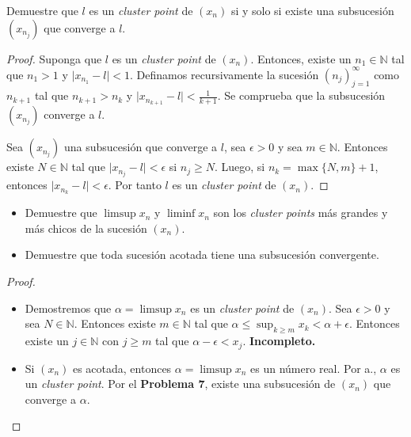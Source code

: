 \documentclass[12pt]{article}
\newcommand{\N}{\mathbb{N}}
\newenvironment{problem}[2][Problema]{\begin{trivlist}
\item[\hskip \labelsep {\bfseries #1}\hskip \labelsep {\bfseries #2.}]}{\end{trivlist}}
\begin{document}
\begin{problem}{7} Demuestre que $l$ es un \textit{cluster point} de $(x_n)$ si y solo si existe una subsucesión $(x_{n_j})$ que converge a $l$.
\end{problem}
\begin{proof}
Suponga que $l$ es un \textit{cluster point} de $(x_n)$. Entonces, existe un $n_1 \in \N$ tal que $n_1 > 1$ y $\lvert x_{n_1}  - l \lvert < 1.$ Definamos recursivamente la sucesión $(n_j)_{j=1}^\infty$ como $n_{k+1}$ tal que $n_{k+1} > n_k$ y $\lvert x_{n_{k+1}}  - l \lvert < \frac{1}{k+1}$. Se comprueba que la subsucesión $(x_{n_j})$ converge a $l$.


Sea $(x_{n_j})$ una subsucesión que converge a $l$, sea $\epsilon > 0$ y sea $m \in \N$. Entonces existe $N \in \N$ tal que $\lvert x_{n_j} - l \lvert < \epsilon$ si $n_j \geq N$. Luego, si $n_k = \max\{N, m\} + 1$, entonces $\lvert x_{n_k} - l \lvert < \epsilon$. Por tanto $l$ es un \textit{cluster point} de $(x_n)$.
\end{proof}


\begin{problem}{8}
\text{ }
\begin{itemize}
    \item[a.] Demuestre que $\limsup{x_n}$ y $\liminf{x_n}$ son los \textit{cluster points} más grandes y más chicos de la sucesión $(x_n).$
    \item[b.] Demuestre que toda sucesión acotada tiene una subsucesión convergente.
\end{itemize}

\end{problem}
\begin{proof}
\text{ }
\begin{itemize}
    \item[a.] Demostremos que $\alpha = \limsup{x_n}$ es un \textit{cluster point} de $(x_n)$. Sea $\epsilon > 0$ y sea $N \in \N$. Entonces existe $m \in \N$ tal que $ \alpha \leq \sup_{k \geq m} x_k < \alpha + \epsilon$. Entonces existe un $j \in \N$ con $j \geq m$ tal que $\alpha - \epsilon < x_j$. \textbf{Incompleto.}
    
    \item[b.] Si $(x_n)$ es acotada, entonces $\alpha = \limsup{x_n}$ es un número real. Por a., $\alpha$ es un \textit{cluster point}. Por el \textbf{Problema 7}, existe una subsucesión de $(x_n)$ que converge a $\alpha.$
\end{itemize}
\end{proof}
\end{document}
